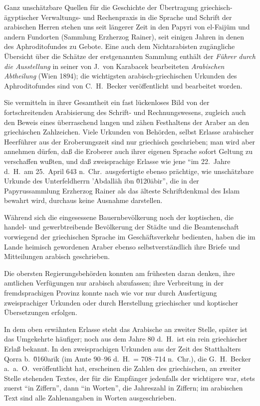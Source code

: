 \documentclass[11pt,a4paper]{article}
\newcommand{\enquote}[1]{``#1''}
\begin{document}
Ganz unsch\"atzbare Quellen f\"ur die Geschichte der \"Ubertragung griechisch-\"agyptischer Verwaltungs- und Rechenpraxis in die Sprache und Schrift der arabischen Herren stehen uns seit l\"angerer Zeit in den Papyri von el-Faij\"um und andern Fundorten (Sammlung Erzherzog Rainer), seit einigen Jahren in denen des Aphroditofundes zu Gebote. Eine auch dem Nichtarabisten zug\"angliche \"Ubersicht \"uber die Sch\"atze der erstgenannten Sammlung enth\"alt der \textit{F\"uhrer durch die Ausstellung} in seiner von J.\ von Karabacek bearbeiteten \textit{Arabischen Abtheilung} (Wien 1894); die wichtigsten arabisch-griechischen Urkunden des Aphroditofundes sind von C.\ H.\ Becker ver\"offentlicht und bearbeitet worden.

Sie vermitteln in ihrer Gesamtheit ein fast l\"uckenloses Bild von der fortschreitenden Arabisierung des Schrift- und Rechnungswesens, zugleich auch den Beweis eines \"uberraschend langen und z\"ahen Festhaltens der Araber an den griechischen Zahlzeichen. Viele Urkunden von Beh\"orden, selbst Erlasse arabischer Heerf\"uhrer aus der Eroberungszeit sind nur griechisch geschrieben; man wird aber annehmen d\"urfen, da\ss{} die Eroberer auch ihrer eigenen Sprache sofort Geltung zu verschaffen wu\ss{}ten, und da\ss{} zweisprachige Erlasse wie jene \enquote{im 22.\ Jahre d.\ H.\ am 25.\ April 643 n.\ Chr.\ ausgefertigte ebenso pr\"achtige, wie unsch\"atzbare Urkunde des Unterfeldherrn 'Abdall\=ah ibn \u0120\=abir}, die in der Papyrussammlung Erzherzog Rainer als das \"alteste Schriftdenkmal des Islam bewahrt wird, durchaus keine Ausnahme darstellen.

W\"ahrend sich die eingesessene Bauernbev\"olkerung noch der koptischen, die handel- und gewerbtreibende Bev\"olkerung der St\"adte und die Beamtenschaft vorwiegend der griechischen Sprache im Gesch\"aftsverkehr bedienten, haben die im Lande heimisch gewordenen Araber ebenso selbstverst\"andlich ihre Briefe und Mitteilungen arabisch geschrieben.

Die obersten Regierungsbeh\"orden konnten am fr\"uhesten daran denken, ihre amtlichen Verf\"ugungen nur arabisch abzufassen; ihre Verbreitung in der fremdsprachigen Provinz konnte nach wie vor nur durch Ausfertigung zweisprachiger Urkunden oder durch Herstellung griechischer und koptischer \"Ubersetzungen erfolgen.

In dem oben erw\"ahnten Erlasse steht das Arabische an zweiter Stelle, sp\"ater ist das Umgekehrte h\"aufiger; noch aus dem Jahre 80 d.\ H.\ ist ein rein griechischer Erla\ss{} bekannt. In den zweisprachigen Urkunden aus der Zeit des Statthalters Qorra b.\ \u0160ar\={i}k (im Amte 90--96 d.\ H.\ = 708--714 n.\ Chr.), die G.\ H.\ Becker a.\ a.\ O.\ ver\"offentlicht hat, erscheinen die Zahlen des griechischen, an zweiter Stelle stehenden Textes, der f\"ur die Empf\"anger jedenfalls der wichtigere war, stets zuerst \enquote{in Ziffern}, dann \enquote{in Worten}, die Jahreszahl in Ziffern; im arabischen Text sind alle Zahlenangaben in Worten ausgeschrieben.
\end{document}

